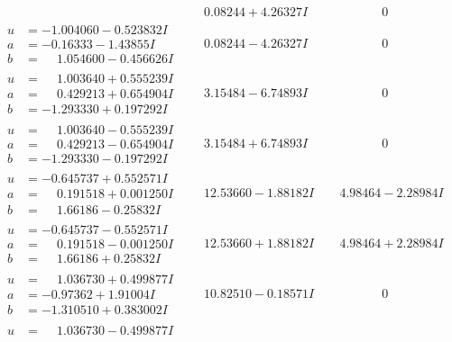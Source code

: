 \documentclass[1p]{elsarticle_modified}
\theoremstyle{definition}
\begin{document}
$$\begin{array}{c|c|c}
 & \phantom{-}0.08244 + 4.26327 I & \phantom{-0.000000 } 0 \\ \hline\begin{aligned}
u &= -1.004060 - 0.523832 I \\
a &= -0.16333 - 1.43855 I \\
b &= \phantom{-}1.054600 - 0.456626 I\end{aligned}
 & \phantom{-}0.08244 - 4.26327 I & \phantom{-0.000000 } 0 \\ \hline\begin{aligned}
u &= \phantom{-}1.003640 + 0.555239 I \\
a &= \phantom{-}0.429213 + 0.654904 I \\
b &= -1.293330 + 0.197292 I\end{aligned}
 & \phantom{-}3.15484 - 6.74893 I & \phantom{-0.000000 } 0 \\ \hline\begin{aligned}
u &= \phantom{-}1.003640 - 0.555239 I \\
a &= \phantom{-}0.429213 - 0.654904 I \\
b &= -1.293330 - 0.197292 I\end{aligned}
 & \phantom{-}3.15484 + 6.74893 I & \phantom{-0.000000 } 0 \\ \hline\begin{aligned}
u &= -0.645737 + 0.552571 I \\
a &= \phantom{-}0.191518 + 0.001250 I \\
b &= \phantom{-}1.66186 - 0.25832 I\end{aligned}
 & \phantom{-}12.53660 - 1.88182 I & \phantom{-}4.98464 - 2.28984 I \\ \hline\begin{aligned}
u &= -0.645737 - 0.552571 I \\
a &= \phantom{-}0.191518 - 0.001250 I \\
b &= \phantom{-}1.66186 + 0.25832 I\end{aligned}
 & \phantom{-}12.53660 + 1.88182 I & \phantom{-}4.98464 + 2.28984 I \\ \hline\begin{aligned}
u &= \phantom{-}1.036730 + 0.499877 I \\
a &= -0.97362 + 1.91004 I \\
b &= -1.310510 + 0.383002 I\end{aligned}
 & \phantom{-}10.82510 - 0.18571 I & \phantom{-0.000000 } 0 \\ \hline\begin{aligned}
u &= \phantom{-}1.036730 - 0.499877 I \\

\end{aligned}
\end{array}$$
\end{document}
